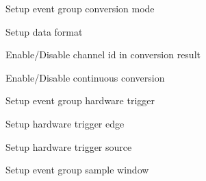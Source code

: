 \begin{DoxyItemize}
\item Setup event group conversion mode
\begin{DoxyItemize}
\item Setup data format
\item Enable/\+Disable channel id in conversion result
\item Enable/\+Disable continuous conversion
\end{DoxyItemize}
\item Setup event group hardware trigger
\begin{DoxyItemize}
\item Setup hardware trigger edge
\item Setup hardware trigger source
\end{DoxyItemize}
\item Setup event group sample window ~\newline
~\newline
~\newline
~\newline
~\newline
~\newline
~\newline
~\newline
~\newline
~\newline
~\newline
~\newline
~\newline
~\newline
~\newline
~\newline
~\newline


\end{DoxyItemize}
